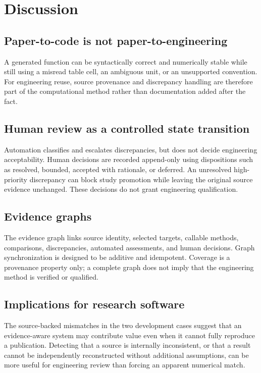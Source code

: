 \section{Discussion}

\subsection{Paper-to-code is not paper-to-engineering}
A generated function can be syntactically correct and numerically stable while still using a misread table cell, an ambiguous unit, or an unsupported convention. For engineering reuse, source provenance and discrepancy handling are therefore part of the computational method rather than documentation added after the fact.

\subsection{Human review as a controlled state transition}
Automation classifies and escalates discrepancies, but does not decide engineering acceptability. Human decisions are recorded append-only using dispositions such as resolved, bounded, accepted with rationale, or deferred. An unresolved high-priority discrepancy can block study promotion while leaving the original source evidence unchanged. These decisions do not grant engineering qualification.

\subsection{Evidence graphs}
The evidence graph links source identity, selected targets, callable methods, comparisons, discrepancies, automated assessments, and human decisions. Graph synchronization is designed to be additive and idempotent. Coverage is a provenance property only; a complete graph does not imply that the engineering method is verified or qualified.

\subsection{Implications for research software}
The source-backed mismatches in the two development cases suggest that an evidence-aware system may contribute value even when it cannot fully reproduce a publication. Detecting that a source is internally inconsistent, or that a result cannot be independently reconstructed without additional assumptions, can be more useful for engineering review than forcing an apparent numerical match.
